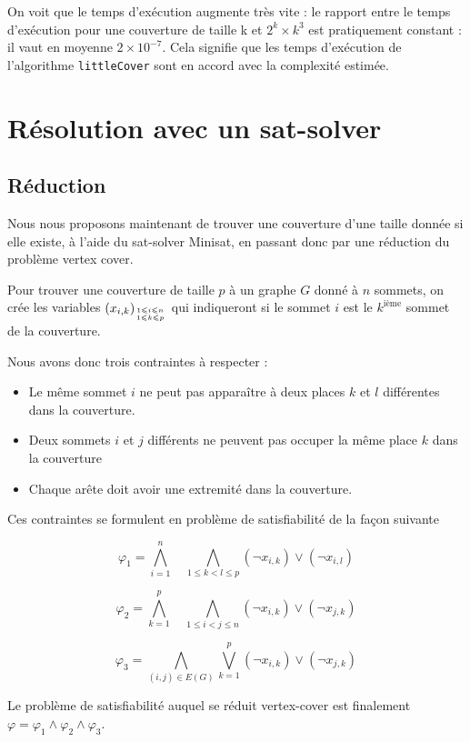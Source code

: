 \documentclass[a4paper,10pt]{article}
\newcommand*{\itemb}{\item[$\bullet$]}
\newcommand*{\dlor}[2]{\displaystyle{\underset{#1}{\overset{#2}{\bigvee}}}}
\newcommand*{\dland}[2]{\displaystyle{\underset{#1}{\overset{#2}{\bigwedge}}}}
\begin{document}
On voit que le temps d'exécution augmente très vite : le rapport entre le temps d'exécution pour une couverture de taille k et $2^k \times k^3$ est pratiquement constant : il vaut en moyenne $2 \times 10^{-7}$. Cela signifie que les temps d'exécution de l'algorithme \texttt{littleCover} sont en accord avec la complexité estimée.

\section{Résolution avec un sat-solver}


\subsection{Réduction}

Nous nous proposons maintenant de trouver une couverture d'une taille donnée si elle existe, à l'aide du sat-solver Minisat, en passant donc par une réduction du problème vertex cover.

Pour trouver une couverture de taille $p$ à un graphe $G$ donné à $n$ sommets, on crée les variables $(x_{i,k})_{1\leqslant i\leqslant n \atop 1\leqslant k \leqslant p}$ qui indiqueront si le sommet $i$ est le $k^{\text{ième}}$ sommet de la couverture.

Nous avons donc trois contraintes à respecter :
\begin{itemize}
 \itemb Le même sommet $i$ ne peut pas apparaître à deux places $k$ et $l$ différentes dans la couverture.
 \itemb Deux sommets $i$ et $j$ différents ne peuvent pas occuper la même place $k$ dans la couverture
 \itemb Chaque arête doit avoir une extremité dans la couverture.
\end{itemize}

Ces contraintes se formulent en problème de satisfiabilité de la façon suivante 

\[\varphi_1=\dland{i=1} n \quad\dland{1\leqslant k < l \leqslant p}{} (\lnot x_{i,k}) \lor (\lnot x_{i,l})\]

\[\varphi_2=\dland{k=1} p \quad \dland{1\leqslant i < j \leqslant n}{} (\lnot x_{i,k}) \lor (\lnot x_{j,k})\]

\[\varphi_3=\dland{(i,j)\in E(G)}{} \dlor{k=1} p  (\lnot x_{i,k}) \lor (\lnot x_{j,k})\]

Le problème de satisfiabilité auquel se réduit vertex-cover est finalement $\varphi=\varphi_1\land \varphi_2\land \varphi_3$.
\end{document}
